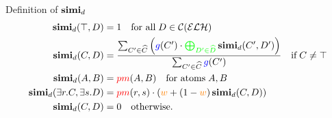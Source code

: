 \documentclass{beamer}
\begin{document}
\begin{frame}{Definition of \(\operatorname{\mathbf{simi}}_d\)}
  \begin{align}
    \simi_d(\top,D) &= 1 \quad
    \text{for all}\; D \in \mathcal{C}(\mathcal{ELH}) \\
    \simi_d(C,D) &=
    \frac{\sum_{C^\prime \in \widehat{C}}\left(\textcolor{blue}{g}(C^\prime) \cdot \textcolor{green}{\bigoplus_{D^\prime \in \widehat{D}}} \simi_d(C^\prime, D^\prime)\right)}%
    {\sum_{C^\prime \in \widehat{C}}\textcolor{blue}{g}(C^\prime)} \quad \text{if}\; C \ne \top \label{simi:general}\\
    \simi_d(A,B) &= \textcolor{red}{pm}(A,B) \quad \text{for atoms}\; A,B \\
    \simi_d(\exists{}r.C,\exists{}s.D) &=
    \textcolor{red}{pm}(r,s) \cdot \left(\textcolor{orange}{w} + (1-\textcolor{orange}{w})\simi_d(C,D)\right) \\
    \simi_d(C,D) &= 0 \quad \text{otherwise}.
  \end{align}
\end{frame}
\end{document}
